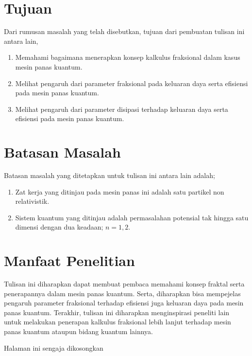 \section{Tujuan}
Dari rumusan masalah yang telah disebutkan, tujuan dari pembuatan tulisan ini antara lain,
\begin{enumerate}
	\item Memahami bagaimana menerapkan konsep kalkulus fraksional dalam kasus mesin panas kuantum.
	\item Melihat pengaruh dari parameter fraksional pada keluaran daya serta efisiensi pada mesin panas kuantum.
        \item Melihat pengaruh dari parameter disipasi terhadap keluaran daya serta efisiensi pada mesin panas kuantum.
\end{enumerate}

\section{Batasan Masalah}
Batasan masalah yang ditetapkan untuk tulisan ini antara lain adalah;
\begin{enumerate}
    \item Zat kerja yang ditinjau pada mesin panas ini adalah satu partikel non relativistik.
    \item Sistem kuantum yang ditinjau adalah permasalahan potensial tak hingga satu dimensi dengan dua keadaan; \(n = 1,2\). 
\end{enumerate}

\section{Manfaat Penelitian}
Tulisan ini diharapkan dapat membuat pembaca memahami konsep fraktal serta penerapannya dalam mesin panas kuantum. Serta, diharapkan bisa mempejelas pengaruh parameter fraksional terhadap efisiensi juga keluaran daya pada mesin panas kuantum. Terakhir, tulisan ini diharapkan menginspirasi peneliti lain untuk melakukan penerapan kalkulus fraksional lebih lanjut terhadap mesin panas kuantum ataupun bidang kuantum lainnya.

\newpage
\thispagestyle{empty}
\vspace*{\fill}
    \begin{center}
	Halaman ini sengaja dikosongkan
    \end{center}
\vspace*{\fill}
\pagebreak
